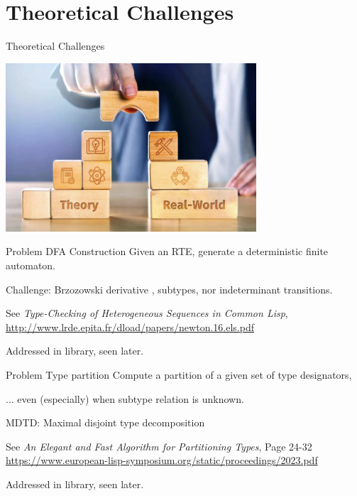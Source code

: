 \section{Theoretical Challenges}

{  
  \begin{frame}{Theoretical Challenges}
      
  \centering
  \includegraphics[width=0.7\textwidth]{theoretic-challenge.png}
\end{frame}
}

\begin{frame}{Problem }{DFA Construction}
  Given an RTE, generate a deterministic finite automaton.

  \medskip
  
  Challenge: Brzozowski derivative , subtypes, nor indeterminant transitions.

  \medskip
  
  See \emph{Type-Checking of Heterogeneous Sequences in Common Lisp}, \url{http://www.lrde.epita.fr/dload/papers/newton.16.els.pdf}

  \medskip

  Addressed in  library, seen later.
\end{frame}

\begin{frame}{Problem }{Type partition}
  Compute a partition of a given set of type designators,

  \medskip
  
  ... even (especially) when subtype relation is unknown.

  \medskip
  
  MDTD: Maximal disjoint type decomposition

  \medskip
  
  See \emph{An Elegant and Fast Algorithm for Partitioning Types}, Page 24-32 \url{https://www.european-lisp-symposium.org/static/proceedings/2023.pdf}

  \medskip
  
  Addressed in  library, seen later.
\end{frame}

